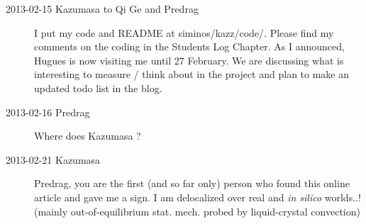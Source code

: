 \begin{description}
\item[2013-02-15 Kazumasa to Qi Ge and Predrag]
I put my code and README at siminos/kazz/code/.
Please find my comments on the coding in the Students Log Chapter.
As I announced, Hugues is now visiting me until 27 February.
We are discussing what is interesting to measure / think about in the project
 and plan to make an updated todo list in the blog.

\item[2013-02-16 Predrag]
Where does Kazumasa
?

\item[2013-02-21 Kazumasa]
Predrag, you are the first (and so far only) person who found this
online article and gave me a sign. I am delocalized over real and
\textit{in silico} worlds..! (mainly out-of-equilibrium stat. mech.
probed by liquid-crystal convection)


\end{description}

\renewcommand{\ssp}{a}
